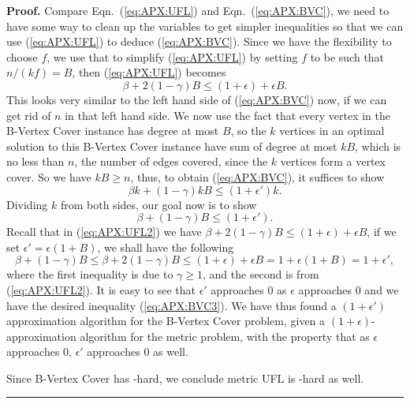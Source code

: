 \documentclass[oneside,final]{ucr}
\newenvironment{proof}[1][Proof]{\textbf{#1.} }{\ \rule{0.5em}{0.5em}}
\begin{document}
\begin{proof}
  Compare Eqn.~(\ref{eq:APX:UFL}) and Eqn.~(\ref{eq:APX:BVC}), we need
  to have some way to clean up the variables to get simpler
  inequalities so that we can use (\ref{eq:APX:UFL}) to deduce
  (\ref{eq:APX:BVC}). Since we have the flexibility to choose $f$, we
  use that to simplify (\ref{eq:APX:UFL}) by setting $f$ to be such
  that $n/(kf) = B$, then (\ref{eq:APX:UFL}) becomes
  \begin{equation}
    \label{eq:APX:UFL2}
    \beta + 2(1-\gamma)B \leq (1+\epsilon) + \epsilon B.
  \end{equation}
  This looks very similar to the left hand side of (\ref{eq:APX:BVC})
  now, if we can get rid of $n$ in that left hand side. We now use the
  fact that every vertex in the B-Vertex Cover instance has degree at
  most $B$, so the $k$ vertices in an optimal solution to this
  B-Vertex Cover instance have sum of degree at most $kB$, which is no
  less than $n$, the number of edges covered, since the $k$ vertices
  form a vertex cover. So we have $kB \geq n$, thus, to obtain
  (\ref{eq:APX:BVC}), it suffices to show
  \begin{equation}
    \label{eq:APX:BVC2}
    \beta k + (1 - \gamma) kB \leq (1 + \epsilon') k.
  \end{equation}
  Dividing $k$ from both sides, our goal now is to show
  \begin{equation}
    \label{eq:APX:BVC3}
    \beta + (1 - \gamma) B \leq (1 + \epsilon').
  \end{equation}
  Recall that in (\ref{eq:APX:UFL2}) we have $\beta + 2(1-\gamma)B
  \leq (1+\epsilon) + \epsilon B$, if we set $\epsilon' = \epsilon (1
  + B)$, we shall have the following
  \begin{equation*}
    \beta + (1-\gamma)B \leq \beta + 2(1-\gamma)B \leq (1+\epsilon) +
    \epsilon B = 1 + \epsilon (1 + B) = 1 + \epsilon',
  \end{equation*}
  where the first inequality is due to $\gamma \geq 1$, and the second
  is from (\ref{eq:APX:UFL2}).  It is easy to see that $\epsilon'$
  approaches $0$ as $\epsilon$ approaches $0$ and we have the desired
  inequality (\ref{eq:APX:BVC3}). We have thus found a $(1+\epsilon')$
  approximation algorithm for the B-Vertex Cover problem, given a
  $(1+\epsilon)$-approximation algorithm for the metric {\UFL}
  problem, with the property that as $\epsilon$ approaches $0$,
  $\epsilon'$ approaches $0$ as well.

  Since B-Vertex Cover has \MaxSNP-hard, we conclude metric UFL is
  \MaxSNP-hard as well.
\end{proof}
\end{document}
